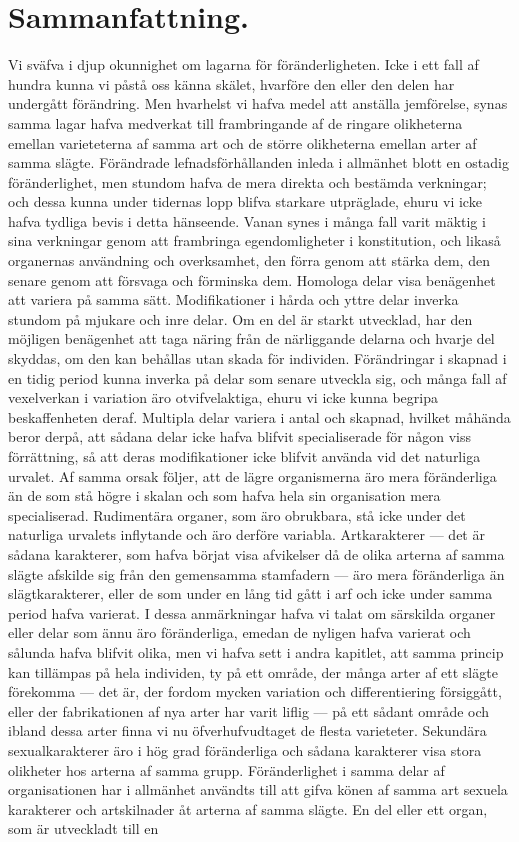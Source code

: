 \section{Sammanfattning.}

Vi sväfva i djup okunnighet om lagarna för föränderligheten. Icke i ett fall af hundra kunna vi påstå oss känna skälet, hvarföre den eller den delen har undergått förändring. Men hvarhelst vi hafva medel att anställa jemförelse, synas samma lagar hafva medverkat till frambringande af de ringare olikheterna emellan varieteterna af samma art och de större olikheterna emellan arter af samma slägte. Förändrade lefnadsförhållanden inleda i allmänhet blott en ostadig föränderlighet, men stundom hafva de mera direkta och bestämda verkningar; och dessa kunna under tidernas lopp blifva starkare utpräglade, ehuru vi icke hafva tydliga bevis i detta hänseende. Vanan synes i många fall varit mäktig i sina verkningar genom att frambringa egendomligheter i konstitution, och likaså organernas användning och overksamhet, den förra genom att stärka dem, den senare genom att försvaga och förminska dem. Homologa delar visa benägenhet att variera på samma sätt. Modifikationer i hårda och yttre delar inverka stundom på mjukare och inre delar. Om en del är starkt utvecklad, har den möjligen benägenhet att taga näring från de närliggande delarna och hvarje del skyddas, om den kan behållas utan skada för individen. Förändringar i skapnad i en tidig period kunna inverka på delar som senare utveckla sig, och många fall af vexelverkan i variation äro otvifvelaktiga, ehuru vi icke kunna begripa beskaffenheten deraf. Multipla delar variera i antal och skapnad, hvilket måhända beror derpå, att sådana delar icke hafva blifvit specialiserade för någon viss förrättning, så att deras modifikationer icke blifvit använda vid det naturliga urvalet. Af samma orsak följer, att de lägre organismerna äro mera föränderliga än de som stå högre i skalan och som hafva hela sin organisation mera specialiserad. Rudimentära organer, som äro obrukbara, stå icke under det naturliga urvalets inflytande och äro derföre variabla. Artkarakterer — det är sådana karakterer, som hafva börjat visa afvikelser då de olika arterna af samma slägte afskilde sig från den gemensamma stamfadern — äro mera föränderliga än slägtkarakterer, eller de som under en lång tid gått i arf och icke under samma period hafva varierat. I dessa anmärkningar hafva vi talat om särskilda organer eller delar som ännu äro föränderliga, emedan de nyligen hafva varierat och sålunda hafva blifvit olika, men vi hafva sett i andra kapitlet, att samma princip kan tillämpas på hela individen, ty på ett område, der många arter af ett slägte förekomma — det är, der fordom mycken variation och differentiering försiggått, eller der fabrikationen af nya arter har varit liflig — på ett sådant område och ibland dessa arter finna vi nu öfverhufvudtaget de flesta varieteter. Sekundära sexualkarakterer äro i hög grad föränderliga och sådana karakterer visa stora olikheter hos arterna af samma grupp. Föränderlighet i samma delar af organisationen har i allmänhet användts till att gifva könen af samma art sexuela karakterer och artskilnader åt arterna af samma slägte. En del eller ett organ, som är utveckladt till en 